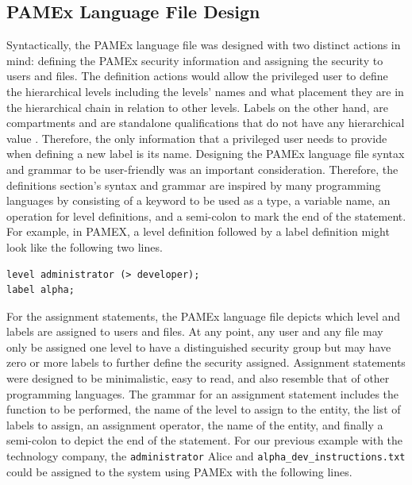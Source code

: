 \subsection{PAMEx Language File Design}
\par 
\vspace{\baselineskip}
\hspace{1em}
Syntactically, the PAMEx language file was designed with two distinct 
actions in mind: defining the PAMEx security information and assigning 
the security to users and files. The definition actions would allow the 
privileged user to define the hierarchical levels including the levels’ 
names and what placement they are in the hierarchical chain in relation 
to other levels. Labels on the other hand, are 
compartments and are standalone qualifications that do not have any 
hierarchical value \cite{natsecinfo}. Therefore, the only information that a privileged 
user needs to provide when defining a new label is its name. Designing 
the PAMEx language file syntax and grammar to be user-friendly was an 
important consideration. Therefore, the definitions 
section’s syntax and grammar are inspired by many programming languages by 
consisting of a keyword to be used as a type, a variable name, an 
operation for level definitions, and a semi-colon to mark the end of 
the statement. For example, in PAMEX, a level definition followed by a label 
definition might look like the following two lines. 

\begin{verbatim}
level administrator (> developer); 
label alpha; 
\end{verbatim}

For the assignment statements, the PAMEx language file depicts 
which level and labels are assigned to users and files. At any 
point, any user and any file may only be assigned one level to have a 
distinguished security group but may have zero or more labels to 
further define the security assigned. Assignment statements were 
designed to be minimalistic, easy to read, and also resemble that of other 
programming languages. The grammar for an assignment statement 
includes the function to be performed, the name of the level to assign 
to the entity, the list of labels to assign, an assignment operator, 
the name of the entity, and finally a semi-colon to depict the end of 
the statement. For our previous example with the technology company, 
the \texttt{administrator} Alice and \texttt{alpha}\texttt{\_dev}\texttt{\_instructions.txt} could be assigned
to the system using PAMEx with the following lines. 

